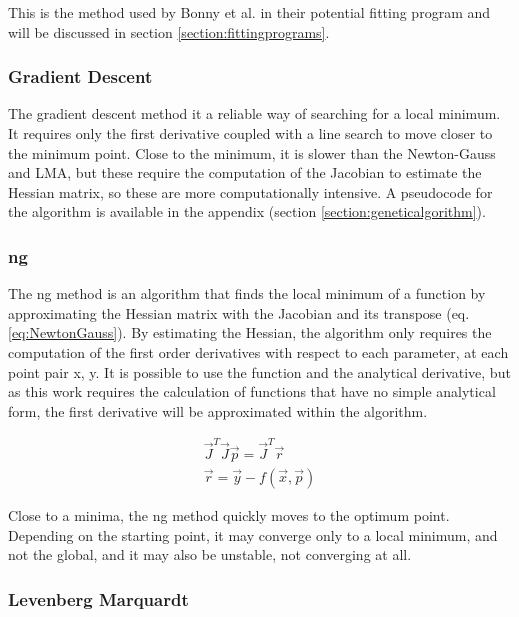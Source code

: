 This is the method used by Bonny et al. in their potential fitting program and will be discussed in section \ref{section:fittingprograms}.


\subsubsection{Gradient Descent}

The gradient descent method it a reliable way of searching for a local minimum.  It requires only the first derivative coupled with a line search to move closer to the minimum point.  Close to the minimum, it is slower than the Newton-Gauss and LMA, but these require the computation of the Jacobian to estimate the Hessian matrix, so these are more computationally intensive.  A pseudocode for the algorithm is available in the appendix (section \ref{section:geneticalgorithm}).


\subsubsection{\acrlong{ng}}
\label{subsection:newtongauss}

The \acrlong{ng} method is an algorithm that finds the local minimum of a function by approximating the Hessian matrix with the Jacobian and its transpose (eq. \ref{eq:NewtonGauss}).  By estimating the Hessian, the algorithm only requires the computation of the first order derivatives with respect to each parameter, at each point pair x, y.  It is possible to use the function and the analytical derivative, but as this work requires the calculation of functions that have no simple analytical form, the first derivative will be approximated within the algorithm.

\begin{equation}
  \begin{split}
    \vec{J}^{T} \vec{J} \vec{p} = \vec{J}^{T} \vec{r} \\
    \vec{r} = \vec{y} - f(\vec{x}, \vec{p})
  \end{split}
  \label{eq:NewtonGauss}
\end{equation}

Close to a minima, the \acrshort{ng} method quickly moves to the optimum point.  Depending on the starting point, it may converge only to a local minimum, and not the global, and it may also be unstable, not converging at all.




\subsubsection{Levenberg Marquardt}

